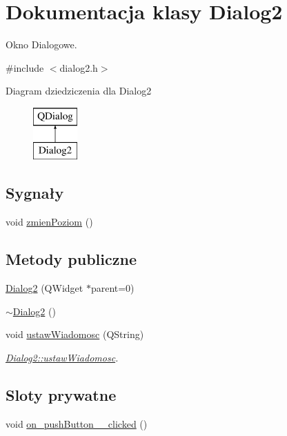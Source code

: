 \hypertarget{classDialog2}{\section{Dokumentacja klasy Dialog2}
\label{classDialog2}
}


Okno Dialogowe.  




{\ttfamily \#include $<$dialog2.\-h$>$}

Diagram dziedziczenia dla Dialog2\begin{figure}[H]
\begin{center}
\leavevmode
\includegraphics[height=2.000000cm]{d9/dde/classDialog2}
\end{center}
\end{figure}
\subsection*{Sygnały}
\begin{DoxyCompactItemize}
\item 
void \hyperlink{classDialog2_a05e8df578a22d2428319b06f65512fd4}{zmien\-Poziom} ()
\end{DoxyCompactItemize}
\subsection*{Metody publiczne}
\begin{DoxyCompactItemize}
\item 
\hyperlink{classDialog2_a78ae31daad000669cd54a31271ce9470}{Dialog2} (Q\-Widget $\ast$parent=0)
\item 
\hyperlink{classDialog2_ae4ceaef72d01b76dcd126b54c875dfaa}{$\sim$\-Dialog2} ()
\item 
void \hyperlink{classDialog2_a7c9262df7b7ea4f6250abdb0f6612a5f}{ustaw\-Wiadomosc} (Q\-String)
\begin{DoxyCompactList}\small\item\em \hyperlink{classDialog2_a7c9262df7b7ea4f6250abdb0f6612a5f}{Dialog2\-::ustaw\-Wiadomosc}. \end{DoxyCompactList}\end{DoxyCompactItemize}
\subsection*{Sloty prywatne}
\begin{DoxyCompactItemize}
\item 
void \hyperlink{classDialog2_a50271de9b195c7b846e00c1f789ddf4e}{on\-\_\-push\-Button\-\_\-\_\-clicked} ()
\end{DoxyCompactItemize}
